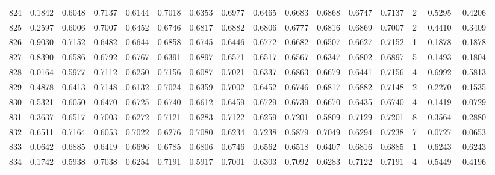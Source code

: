 \begin{tabular}{lrrrrrrrrrrrrrrr}
824 &      0.1842 &  0.6048 &  0.7137 &  0.6144 &  0.7018 &  0.6353 &  0.6977 &  0.6465 &  0.6683 &  0.6868 &   0.6747 &     0.7137 &      2 &                    0.5295 &                     0.4206 \\
825 &      0.2597 &  0.6006 &  0.7007 &  0.6452 &  0.6746 &  0.6817 &  0.6882 &  0.6806 &  0.6777 &  0.6816 &   0.6869 &     0.7007 &      2 &                    0.4410 &                     0.3409 \\
826 &      0.9030 &  0.7152 &  0.6482 &  0.6644 &  0.6858 &  0.6745 &  0.6446 &  0.6772 &  0.6682 &  0.6507 &   0.6627 &     0.7152 &      1 &                   -0.1878 &                    -0.1878 \\
827 &      0.8390 &  0.6586 &  0.6792 &  0.6767 &  0.6391 &  0.6897 &  0.6571 &  0.6517 &  0.6567 &  0.6347 &   0.6802 &     0.6897 &      5 &                   -0.1493 &                    -0.1804 \\
828 &      0.0164 &  0.5977 &  0.7112 &  0.6250 &  0.7156 &  0.6087 &  0.7021 &  0.6337 &  0.6863 &  0.6679 &   0.6441 &     0.7156 &      4 &                    0.6992 &                     0.5813 \\
829 &      0.4878 &  0.6413 &  0.7148 &  0.6132 &  0.7024 &  0.6359 &  0.7002 &  0.6452 &  0.6746 &  0.6817 &   0.6882 &     0.7148 &      2 &                    0.2270 &                     0.1535 \\
830 &      0.5321 &  0.6050 &  0.6470 &  0.6725 &  0.6740 &  0.6612 &  0.6459 &  0.6729 &  0.6739 &  0.6670 &   0.6435 &     0.6740 &      4 &                    0.1419 &                     0.0729 \\
831 &      0.3637 &  0.6517 &  0.7003 &  0.6272 &  0.7121 &  0.6283 &  0.7122 &  0.6259 &  0.7201 &  0.5809 &   0.7129 &     0.7201 &      8 &                    0.3564 &                     0.2880 \\
832 &      0.6511 &  0.7164 &  0.6053 &  0.7022 &  0.6276 &  0.7080 &  0.6234 &  0.7238 &  0.5879 &  0.7049 &   0.6294 &     0.7238 &      7 &                    0.0727 &                     0.0653 \\
833 &      0.0642 &  0.6885 &  0.6419 &  0.6696 &  0.6785 &  0.6806 &  0.6746 &  0.6562 &  0.6518 &  0.6407 &   0.6816 &     0.6885 &      1 &                    0.6243 &                     0.6243 \\
834 &      0.1742 &  0.5938 &  0.7038 &  0.6254 &  0.7191 &  0.5917 &  0.7001 &  0.6303 &  0.7092 &  0.6283 &   0.7122 &     0.7191 &      4 &                    0.5449 &                     0.4196 \\

\end{tabular}
